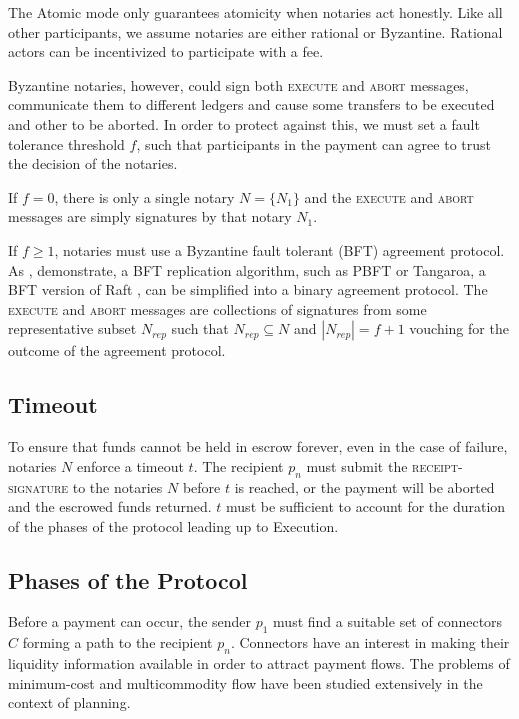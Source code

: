 \documentclass[letterpaper,twocolumn,10pt]{article}
\begin{document}
The Atomic mode only guarantees atomicity when notaries act honestly. Like all other participants, we assume notaries are either rational or Byzantine. Rational actors can be incentivized to participate with a fee.

Byzantine notaries, however, could sign both \textsc{execute} and \textsc{abort} messages, communicate them to different ledgers and cause some transfers to be executed and other to be aborted. In order to protect against this, we must set a fault tolerance threshold $f$, such that participants in the payment can agree to trust the decision of the notaries.

If $f = 0$, there is only a single notary $N = \{ N_1 \}$ and the \textsc{execute} and \textsc{abort} messages are simply signatures by that notary $N_1$.

If $f \geq 1$, notaries must use a Byzantine fault tolerant (BFT) agreement protocol. As \cite{gray2006consensus}, \cite{mohan1983method} demonstrate, a BFT replication algorithm, such as PBFT \cite{castro1999practical} or Tangaroa, a BFT version of Raft \cite{copelandtangaroa}, can be simplified into a binary agreement protocol. The \textsc{execute} and \textsc{abort} messages are collections of signatures from some representative subset $N_{rep}$ such that $N_{rep} \subseteq N$ and $|N_{rep}| = f+1$ vouching for the outcome of the agreement protocol.

\subsection{Timeout}
\label{subsec:timeout}


To ensure that funds cannot be held in escrow forever, even in the case of failure, notaries $N$ enforce a timeout $t$. The recipient $p_n$ must submit the \textsc{receipt-signature} to the notaries $N$ before $t$ is reached, or the payment will be aborted and the escrowed funds returned. $t$ must be sufficient to account for the duration of the phases of the protocol leading up to Execution.

\subsection{Phases of the Protocol}

Before a payment can occur, the sender $p_1$ must find a suitable set of connectors $C$ forming a path to the recipient $p_n$. Connectors have an interest in making their liquidity information available in order to attract payment flows. The problems of minimum-cost and multicommodity flow have been studied extensively in the context of planning. \cite{ahuja1988network} \cite{cai2001time} \cite{wagner1959class}
\end{document}
